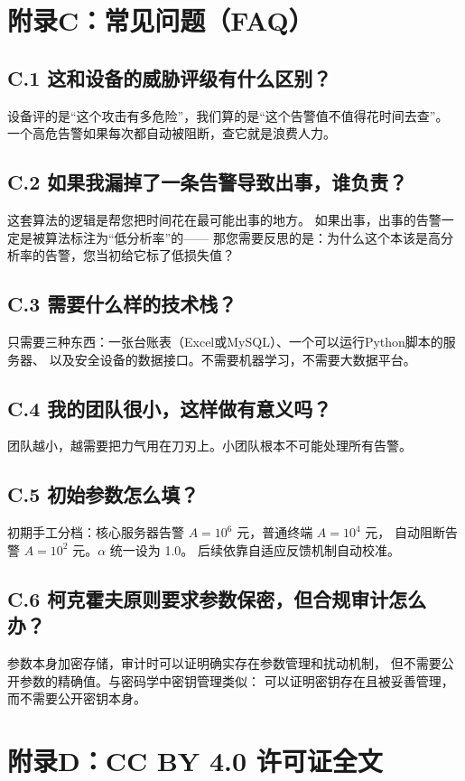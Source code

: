 \documentclass[11pt,a4paper]{article}
\begin{document}
\section{附录C：常见问题（FAQ）}

\subsection*{C.1 这和设备的威胁评级有什么区别？}
设备评的是“这个攻击有多危险”，我们算的是“这个告警值不值得花时间去查”。
一个高危告警如果每次都自动被阻断，查它就是浪费人力。

\subsection*{C.2 如果我漏掉了一条告警导致出事，谁负责？}
这套算法的逻辑是帮您把时间花在最可能出事的地方。
如果出事，出事的告警一定是被算法标注为“低分析率”的——
那您需要反思的是：为什么这个本该是高分析率的告警，您当初给它标了低损失值？

\subsection*{C.3 需要什么样的技术栈？}
只需要三种东西：一张台账表（Excel或MySQL）、一个可以运行Python脚本的服务器、
以及安全设备的数据接口。不需要机器学习，不需要大数据平台。

\subsection*{C.4 我的团队很小，这样做有意义吗？}
团队越小，越需要把力气用在刀刃上。小团队根本不可能处理所有告警。

\subsection*{C.5 初始参数怎么填？}
初期手工分档：核心服务器告警 $A=10^6$ 元，普通终端 $A=10^4$ 元，
自动阻断告警 $A=10^2$ 元。$\alpha$ 统一设为 1.0。
后续依靠自适应反馈机制自动校准。

\subsection*{C.6 柯克霍夫原则要求参数保密，但合规审计怎么办？}
参数本身加密存储，审计时可以证明确实存在参数管理和扰动机制，
但不需要公开参数的精确值。与密码学中密钥管理类似：
可以证明密钥存在且被妥善管理，而不需要公开密钥本身。

\section{附录D：CC BY 4.0 许可证全文}
\end{document}
